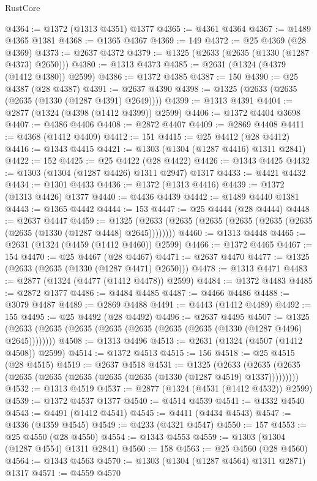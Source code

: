 \begin{lexlean}{RustCore}
\begin{coremodule}
@4364 := @1372 (@1313 @4351) @1377
@4365 := @4361 @4364
@4367 := @1489 @4365 @1381
@4368 := @1365 @4367
@4369 := 149
@4372 := @25 @4369 (@28 @4369)
@4373 := @2637 @4372
@4379 := @1325 (@2633 (@2635 (@1330 (@1287 @4373) @2650)))
@4380 := @1313 @4373
@4385 := @2631 (@1324 (@4379 (@1412 @4380)) @2599)
@4386 := @1372 @4385
@4387 := 150
@4390 := @25 @4387 (@28 @4387)
@4391 := @2637 @4390
@4398 := @1325 (@2633 (@2635 (@2635 (@1330 (@1287 @4391) @2649))))
@4399 := @1313 @4391
@4404 := @2877 (@1324 (@4398 (@1412 @4399)) @2599)
@4406 := @1372 @4404 @3698
@4407 := @4386 @4406
@4408 := @2872 @4407
@4409 := @2869 @4408
@4411 := @4368 (@1412 @4409)
@4412 := 151
@4415 := @25 @4412 (@28 @4412)
@4416 := @1343 @4415
@4421 := @1303 (@1304 (@1287 @4416) @1311 @2841)
@4422 := 152
@4425 := @25 @4422 (@28 @4422)
@4426 := @1343 @4425
@4432 := @1303 (@1304 (@1287 @4426) @1311 @2947) @1317
@4433 := @4421 @4432
@4434 := @1301 @4433
@4436 := @1372 (@1313 @4416)
@4439 := @1372 (@1313 @4426) @1377
@4440 := @4436 @4439
@4442 := @1489 @4440 @1381
@4443 := @1365 @4442
@4444 := 153
@4447 := @25 @4444 (@28 @4444)
@4448 := @2637 @4447
@4459 := @1325 (@2633 (@2635 (@2635 (@2635 (@2635 (@2635 (@2635 (@1330 (@1287 @4448) @2645))))))))
@4460 := @1313 @4448
@4465 := @2631 (@1324 (@4459 (@1412 @4460)) @2599)
@4466 := @1372 @4465
@4467 := 154
@4470 := @25 @4467 (@28 @4467)
@4471 := @2637 @4470
@4477 := @1325 (@2633 (@2635 (@1330 (@1287 @4471) @2650)))
@4478 := @1313 @4471
@4483 := @2877 (@1324 (@4477 (@1412 @4478)) @2599)
@4484 := @1372 @4483
@4485 := @2872 @1377
@4486 := @4484 @4485
@4487 := @4466 @4486
@4488 := @3079 @4487
@4489 := @2869 @4488
@4491 := @4443 (@1412 @4489)
@4492 := 155
@4495 := @25 @4492 (@28 @4492)
@4496 := @2637 @4495
@4507 := @1325 (@2633 (@2635 (@2635 (@2635 (@2635 (@2635 (@2635 (@1330 (@1287 @4496) @2645))))))))
@4508 := @1313 @4496
@4513 := @2631 (@1324 (@4507 (@1412 @4508)) @2599)
@4514 := @1372 @4513
@4515 := 156
@4518 := @25 @4515 (@28 @4515)
@4519 := @2637 @4518
@4531 := @1325
    (@2633 (@2635 (@2635 (@2635 (@2635 (@2635 (@2635 (@2635 (@1330 (@1287 @4519) @1337)))))))))
@4532 := @1313 @4519
@4537 := @2877 (@1324 (@4531 (@1412 @4532)) @2599)
@4539 := @1372 @4537 @1377
@4540 := @4514 @4539
@4541 := @4332 @4540
@4543 := @4491 (@1412 @4541)
@4545 := @4411 (@4434 @4543)
@4547 := @4336 (@4359 @4545)
@4549 := @4233 (@4321 @4547)
@4550 := 157
@4553 := @25 @4550 (@28 @4550)
@4554 := @1343 @4553
@4559 := @1303 (@1304 (@1287 @4554) @1311 @2841)
@4560 := 158
@4563 := @25 @4560 (@28 @4560)
@4564 := @1343 @4563
@4570 := @1303 (@1304 (@1287 @4564) @1311 @2871) @1317
@4571 := @4559 @4570

\end{coremodule}
\end{lexlean}
